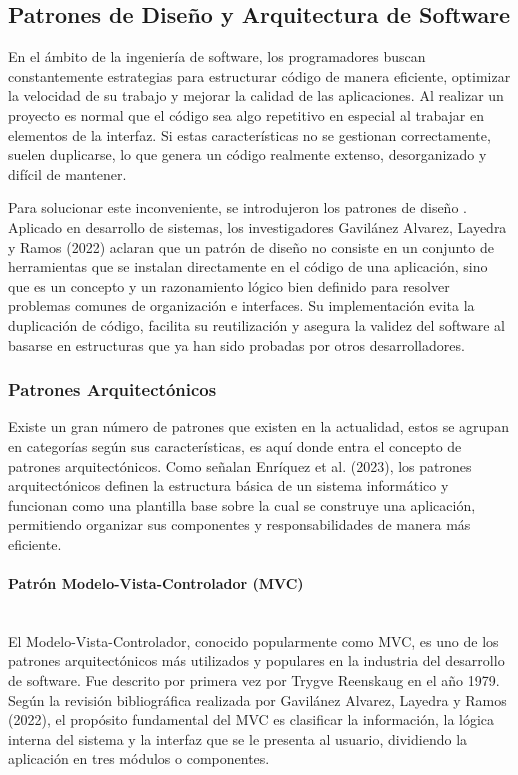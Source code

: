 \subsection{Patrones de Diseño y Arquitectura de Software}
\label{sec:patrones_diseno}
En el ámbito de la ingeniería de software, los programadores buscan constantemente estrategias para estructurar código de manera eficiente, optimizar la velocidad de su trabajo y mejorar la calidad de las aplicaciones. Al realizar un proyecto es normal que el código sea algo repetitivo en especial al trabajar en elementos de la interfaz. Si estas características no se gestionan correctamente, suelen duplicarse, lo que genera un código realmente extenso, desorganizado y difícil de mantener. 

Para solucionar este inconveniente, se introdujeron los patrones de diseño . Aplicado en desarrollo de sistemas, los investigadores Gavilánez Alvarez, Layedra y Ramos (2022) aclaran que un patrón de diseño no consiste en un conjunto de herramientas que se instalan directamente en el código de una aplicación, sino que es un concepto y un razonamiento lógico bien definido para resolver problemas comunes de organización e interfaces.\cite{alvarez2022analisis} Su implementación evita la duplicación de código, facilita su reutilización y asegura la validez del software al basarse en estructuras que ya han sido probadas por otros desarrolladores.
\subsubsection{Patrones Arquitectónicos}
\label{sec:patrones_arquitectonicos}
Existe un gran número de patrones que existen en la actualidad, estos se agrupan en categorías según sus características, es aquí donde entra el concepto de patrones arquitectónicos. Como señalan Enríquez et al. (2023), los patrones arquitectónicos definen la estructura básica de un sistema informático y funcionan como una plantilla base sobre la cual se construye una aplicación, permitiendo organizar sus componentes y responsabilidades de manera más eficiente.\cite{enriquez2023impacto}

\paragraph{Patrón Modelo-Vista-Controlador (MVC)} ~\\
\label{sec:mvc}El Modelo-Vista-Controlador, conocido popularmente como MVC, es uno de los patrones arquitectónicos más utilizados y populares en la industria del desarrollo de software. Fue descrito por primera vez por Trygve Reenskaug en el año 1979. Según la revisión bibliográfica realizada por Gavilánez Alvarez, Layedra y Ramos (2022), el propósito fundamental del MVC es clasificar la información, la lógica interna del sistema y la interfaz que se le presenta al usuario, dividiendo la aplicación en tres módulos o componentes.\cite{alvarez2022analisis}

